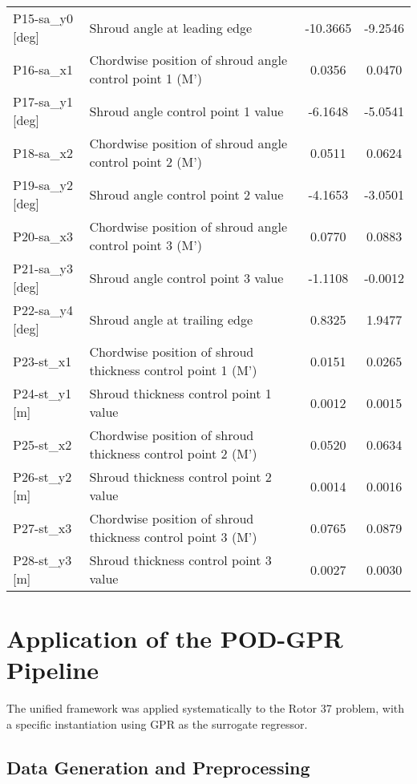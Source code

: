 \documentclass[dsc, EN]{ufabcFHZh}
\begin{document}
{\begin{table}[htbp]
\begin{tabular}{|l|l|c|c|}
    P15-sa\_y0 [deg] & Shroud angle at leading edge & -10.3665 & -9.2546 \\
    P16-sa\_x1 & Chordwise position of shroud angle control point 1 (M') & 0.0356 & 0.0470 \\
    P17-sa\_y1 [deg] & Shroud angle control point 1 value & -6.1648 & -5.0541 \\
    P18-sa\_x2 & Chordwise position of shroud angle control point 2 (M') & 0.0511 & 0.0624 \\
    P19-sa\_y2 [deg] & Shroud angle control point 2 value & -4.1653 & -3.0501 \\
    P20-sa\_x3 & Chordwise position of shroud angle control point 3 (M') & 0.0770 & 0.0883 \\
    P21-sa\_y3 [deg] & Shroud angle control point 3 value & -1.1108 & -0.0012 \\
    P22-sa\_y4 [deg] & Shroud angle at trailing edge & 0.8325 & 1.9477 \\
    P23-st\_x1 & Chordwise position of shroud thickness control point 1 (M') & 0.0151 & 0.0265 \\
    P24-st\_y1 [m] & Shroud thickness control point 1 value & 0.0012 & 0.0015 \\
    P25-st\_x2 & Chordwise position of shroud thickness control point 2 (M') & 0.0520 & 0.0634 \\
    P26-st\_y2 [m] & Shroud thickness control point 2 value & 0.0014 & 0.0016 \\
    P27-st\_x3 & Chordwise position of shroud thickness control point 3 (M') & 0.0765 & 0.0879 \\
    P28-st\_y3 [m] & Shroud thickness control point 3 value & 0.0027 & 0.0030 \\
    \hline
  \end{tabular}
\end{table}

\section{Application of the POD-GPR Pipeline}

The unified framework was applied systematically to the Rotor 37 problem, with a specific instantiation using GPR as the surrogate regressor.


\subsection{ Data Generation and Preprocessing}

}
\end{document}
